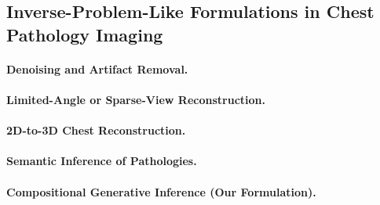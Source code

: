 \subsection{Inverse-Problem-Like Formulations in Chest Pathology Imaging}

\paragraph{Denoising and Artifact Removal.}

\paragraph{Limited-Angle or Sparse-View Reconstruction.}

\paragraph{2D-to-3D Chest Reconstruction.}

\paragraph{Semantic Inference of Pathologies.}

\paragraph{Compositional Generative Inference (Our Formulation).}

